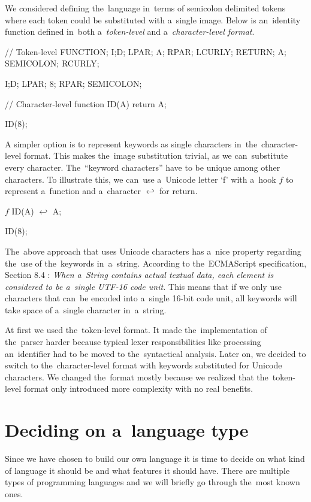 We considered defining the~language in~terms of semicolon delimited tokens where each token could be substituted with a~single image.
Below is an~identity function defined in~both a~\emph{token-level} and a~\emph{character-level format}.
\begin{code}
// Token-level
FUNCTION; I;D; LPAR; A; RPAR; LCURLY;
RETURN; A; SEMICOLON;
RCURLY;

I;D; LPAR; 8; RPAR; SEMICOLON;

// Character-level
function ID(A) {
    return A;
}

ID(8);
\end{code}

A simpler option is to represent keywords as single characters in~the~character-level format. This makes the~image substitution trivial, as we can~substitute
every character. The~``keyword characters'' have to be unique among other characters. To illustrate this, we can~use a~Unicode letter `f' with a~hook $f$
to represent a~function and a~character $\hookleftarrow$ for return.
\begin{code}
$f$ ID(A) {
    $\hookleftarrow$ A;
}

ID(8);
\end{code}

The~above approach that uses Unicode characters has a~nice property regarding the~use of the~keywords in~a~string. According to the~ECMAScript specification,
Section 8.4 \cite{Ecmascript}: \emph{When a~String contains actual textual data, each element is considered to be a~single UTF-16 code unit.} This means that if we
only use characters that can~be encoded into a~single 16-bit code unit, all keywords will take space of a~single character in~a~string.

At first we used the~token-level format. It made the~implementation of the~parser harder because typical lexer responsibilities like processing
an~identifier had to be moved to the~syntactical analysis. Later on, we decided to switch to the~character-level format with keywords substituted for
Unicode characters. We changed the~format mostly because we realized that the~token-level format only introduced more complexity with no real benefits.

\section{Deciding on a~language type}
Since we have chosen to build our own language it is time to decide on what kind of language it should be and what features it should have. There are
multiple types of programming languages and we will briefly go through the~most known ones.

